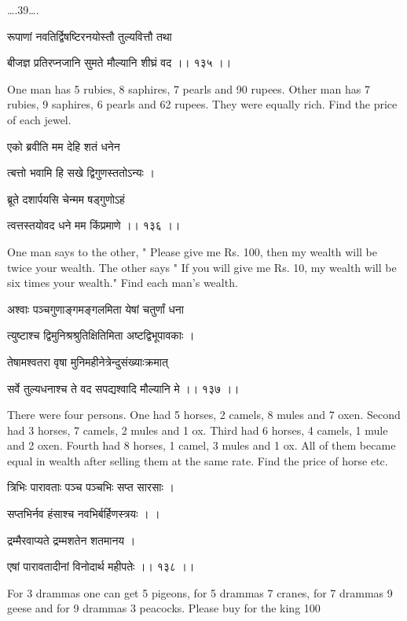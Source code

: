 \documentclass[]{article}
\date{}
\begin{document}
{\ldots{}.39\ldots{}.}

{रूपाणां नवतिर्द्विषष्टिरनयोस्तौ तुल्यवित्तौ तथा }

{बीजज्ञ प्रतिरप्नजानि सुमते मौल्यानि शीघ्रं वद ।। १३५ ।। }

{One man has 5 rubies, 8 saphires, 7 pearls and 90 rupees. Other man has
7 rubies, 9 saphires, 6 pearls and 62 rupees. They were equally rich.
Find the price of each jewel.}

{एको ब्रवीति मम देहि शतं धनेन }

{त्बत्तो भवामि हि सखे द्विगुणस्ततोऽन्यः । }

{ब्रूते दशार्पयसि चेन्मम षड्गुणोऽहं }

{त्वत्तस्तयोवद धने मम किंप्रमाणे ।। १३६ ।।}

{One man says to the other, " Please give me Rs. 100, then my wealth
will be twice your wealth. The other says " If you will give me Rs. 10,
my wealth will be six times your wealth." Find each man's wealth.}

{अश्वाः पञ्चगुणाङ्गमङ्गलमिता येषां चतुर्णां धना }

{त्युष्टाश्च द्विमुनिश्रश्रुतिक्षितिमिता अष्टद्विभूपावकाः । }

{तेषामश्वतरा वृषा मुनिमहीनेत्रेन्दुसंख्याःक्रमात्}

{सर्वे तुल्यधनाश्च ते वद सपद्यश्वादि मौल्यानि मे ।। १३७ ।। }

{There were four persons. One had 5 horses, 2 camels, 8 mules and 7
oxen. Second had 3 horses, 7 camels, 2 mules and 1 ox. Third had 6
horses, 4 camels, 1 mule and 2 oxen. Fourth had 8 horses, 1 camel, 3
mules and 1 ox. All of them became equal in wealth after selling them at
the same rate. Find the price of horse etc.}

{त्रिभिः पारावताः पञ्च पञ्चभिः सप्त सारसाः । }

{सप्तभिर्नव हंसाश्च नवभिर्बर्हिणस्त्रयः । । }

{द्रम्मैरवाप्यते द्रम्मशतेन शतमानय । }

{एषां पारावतादीनां विनोदार्थ महीपतेः ।। १३८ ।। }

{For 3 drammas one can get 5 pigeons, for 5 drammas 7 cranes, for 7
drammas 9 geese and for 9 drammas 3 peacocks. Please buy for the king
100\\
}
\end{document}
